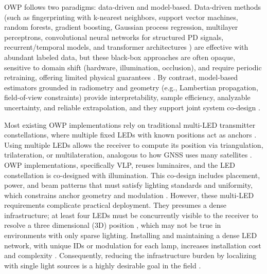 \documentclass[journal]{IEEEtran}
\begin{document}
OWP follows two paradigms: data-driven and model-based.
Data-driven methods (such as fingerprinting with k-nearest neighbors, support vector machines, random forests, gradient boosting, Gaussian process regression, multilayer perceptrons, convolutional neural networks for structured PD signals, recurrent/temporal models, and transformer architectures \cite{Rekkas2023, Tran2022}) are effective with abundant labeled data, but these black-box approaches are often opaque, sensitive to domain shift (hardware, illumination, occlusion), and require periodic retraining, offering limited physical guarantees \cite{Glass2021}. 
By contrast, model-based estimators grounded in radiometry and geometry (e.g., Lambertian propagation, field-of-view constraints) provide interpretability, sample efficiency, analyzable uncertainty, and reliable extrapolation, and they support joint system co-design \cite{Deng2023}.



Most existing OWP implementations rely on traditional multi-LED transmitter constellations, where multiple fixed LEDs with known positions act as anchors \cite{Zhuang2018}. Using multiple LEDs allows the receiver to compute its position via triangulation, trilateration, or multilateration, analogous to how GNSS uses many satellites \cite{Wang2024b}. 
OWP implementations, specifically VLP, reuses luminaires, and the LED constellation is co-designed with illumination. This co-design includes placement, power, and beam patterns that must satisfy lighting standards and uniformity, which constrains anchor geometry and modulation \cite{photonics9100750}.
However, these multi-LED requirements complicate practical deployment. They presumes a dense infrastructure; at least four LEDs must be concurrently visible to the receiver to resolve a three dimensional (3D) position \cite{Plets2019,electronics8111311, ALMADANI2021126654,Zhang2020}, which may not be true in environments with only sparse lighting. Installing and maintaining a dense LED network, with unique IDs or modulation for each lamp, increases installation cost and complexity \cite{Cossu2022}. 
Consequently, reducing the infrastructure burden by localizing with single light sources is a highly desirable goal in the field \cite{Rekkas2023}.
\end{document}
